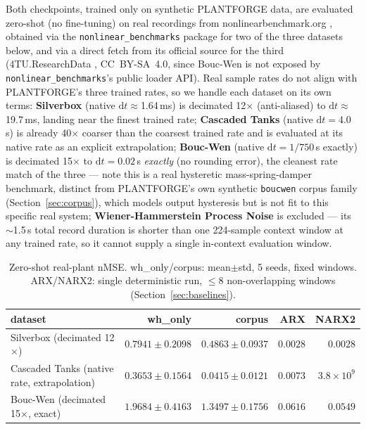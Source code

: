 \documentclass{article}
\begin{document}
Both checkpoints, trained only on synthetic PLANTFORGE data, are evaluated
zero-shot (no fine-tuning) on real recordings from
nonlinearbenchmark.org \citep{wigren2013three, schoukens2019nonlinear}, obtained
via the \texttt{nonlinear\_benchmarks} package for two of the three datasets
below, and via a direct fetch from its official source for the third
(4TU.ResearchData \citep{noel2020boucwen}, CC~BY-SA~4.0, since Bouc-Wen is not
exposed by \texttt{nonlinear\_benchmarks}'s public loader API). Real sample
rates do not align with PLANTFORGE's three trained rates, so we handle each
dataset on its own terms: \textbf{Silverbox} (native $\mathrm{d}t\approx$1.64\,ms)
is decimated 12$\times$ (anti-aliased) to $\mathrm{d}t\approx$19.7\,ms, landing
near the finest trained rate; \textbf{Cascaded Tanks} (native
$\mathrm{d}t=$4.0\,s) is already 40$\times$ coarser than the coarsest trained
rate and is evaluated at its native rate as an explicit extrapolation;
\textbf{Bouc-Wen} (native $\mathrm{d}t=1/750$\,s exactly) is decimated
15$\times$ to $\mathrm{d}t=0.02$\,s \emph{exactly} (no rounding error), the
cleanest rate match of the three --- note this is a real hysteretic
mass-spring-damper benchmark, distinct from PLANTFORGE's own synthetic
\texttt{boucwen} corpus family (Section~\ref{sec:corpus}), which models output
hysteresis but is not fit to this specific real system;
\textbf{Wiener-Hammerstein Process Noise} is excluded --- its $\sim$1.5\,s
total record duration is shorter than one 224-sample context window at any
trained rate, so it cannot supply a single in-context evaluation window.

\begin{table}[h]
  \caption{Zero-shot real-plant nMSE. wh\_only/corpus: mean$\pm$std, 5 seeds,
  fixed windows. ARX/NARX2: single deterministic run, $\leq$8 non-overlapping
  windows (Section~\ref{sec:baselines}).}
  \label{tab:realplant}
  \centering
  \small
  \begin{tabular}{lrrrr}
    \toprule
    dataset & wh\_only & corpus & ARX & NARX2 \\
    \midrule
    Silverbox (decimated 12$\times$) & $0.7941\pm0.2098$ & $0.4863\pm0.0937$ & $\mathbf{0.0028}$ & $0.0028$ \\
    Cascaded Tanks (native rate, extrapolation) & $0.3653\pm0.1564$ & $0.0415\pm0.0121$ & $\mathbf{0.0073}$ & $3.8\times10^{9}$ \\
    Bouc-Wen (decimated 15$\times$, exact) & $1.9684\pm0.4163$ & $1.3497\pm0.1756$ & $\mathbf{0.0616}$ & $0.0549$ \\
    \bottomrule
  \end{tabular}
\end{table}
\end{document}
